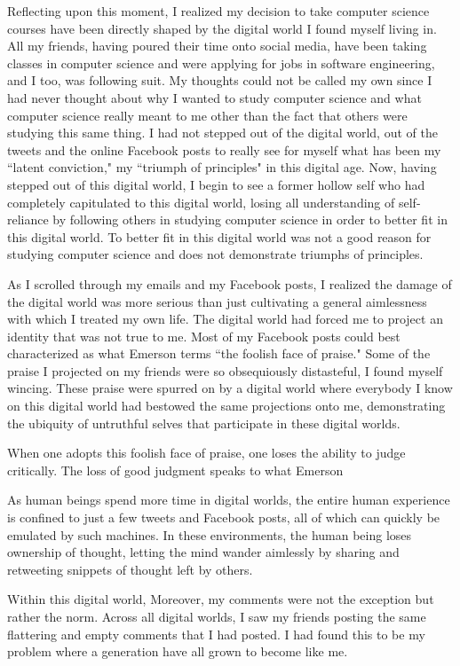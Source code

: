 \documentclass[12pt,letterpaper]{article}
\begin{document}
Reflecting upon this moment, I realized my decision to take computer science courses have been directly shaped by the digital world I found myself living in.  All my friends, having poured their time onto social media, have been taking classes in computer science and were applying for jobs in software engineering, and I too, was following suit.  My thoughts could not be called my own since I had never thought about why I wanted to study computer science and what computer science really meant to me other than the fact that others were studying this same thing.  I had not stepped out of the digital world, out of the tweets and the online Facebook posts to really see for myself what has been my ``latent conviction," my ``triumph of principles" in this digital age.  Now, having stepped out of this digital world, I begin to see a former hollow self who had completely capitulated to this digital world, losing all understanding of self-reliance by following others in studying computer science in order to better fit in this digital world.  To better fit in this digital world was not a good reason for studying computer science and does not demonstrate triumphs of principles.

As I scrolled through my emails and my Facebook posts, I realized the damage of the digital world was more serious than just cultivating a general aimlessness with which I treated my own life.  The digital world had forced me to project an identity that was not true to me.  Most of my Facebook posts could best characterized as what Emerson terms  ``the foolish face of praise."  Some of the praise I projected on my friends were so obsequiously distasteful, I found myself wincing.   These praise were spurred on by a digital world where everybody I know on this digital world had bestowed the same projections onto me, demonstrating the ubiquity of untruthful selves that participate in these digital worlds.

When one adopts this foolish face of praise, one loses the ability to judge critically.  The loss of good judgment speaks to what Emerson 

 As human beings spend more time in digital worlds, the entire human experience is confined to just a few tweets and Facebook posts, all of which can quickly be emulated by such machines.  In these environments, the human being loses ownership of thought, letting the mind wander aimlessly by sharing and retweeting snippets of thought left by others.


Within this digital world, Moreover, my comments were not the exception but rather the norm.  Across all digital worlds, I saw my friends posting the same flattering and empty comments that I had posted.  I had found this to be my problem where a generation have all grown to become like me.
\end{document}
